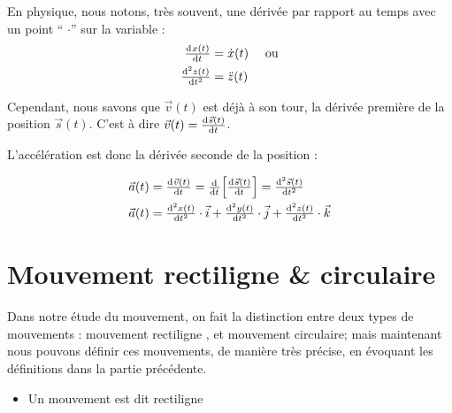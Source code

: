 \documentclass[11pt,a4paper]{article}
\begin{document}
\begingroup
\begin{table}
\begin{rmrq}
En physique, nous notons, très souvent, une dérivée par rapport au temps avec un point `` $\cdot$''  sur la variable  : 
\begin{align*}
    \od{x(t)}{t} &= \dot{x}(t) \quad \text{ ou} \\
    \od[2]{z(t)}{t} &= \Ddot{z}(t)
\end{align*}
\end{rmrq}
\end{table}  

Cependant, nous savons que $\vec{v}(t)$ est déjà à son tour, la dérivée première de la position $\vec{s}(t)$. C'est à dire $\vec{v}(t) = \od{\vec{s}(t)}{t}$. 

L'accélération est donc la dérivée seconde de la position : 

\begin{align*}
    \Vec{a}(t) &= \od{\Vec{v}(t)}{t} = \od{ }{t}\Big[ \od{\vec{s}(t)}{t} \Big] = \od[2]{\vec{s}(t)}{t}\\
    \Vec{a}(t) &= \od[2]{x(t)}{t}\cdot \Vec{i} + \od[2]{y(t)}{t}\cdot \Vec{j} + \od[2]{z(t)}{t}\cdot \Vec{k} \\
\end{align*}
\endgroup

\section{Mouvement rectiligne \& circulaire}

Dans notre étude du mouvement, on fait la distinction entre deux types de mouvements : mouvement rectiligne , et mouvement circulaire; mais maintenant nous pouvons définir ces mouvements, de manière très précise, en évoquant les définitions dans la partie précédente. 

\begin{itemize}
    \item Un mouvement est dit rectiligne 
\end{itemize}






\end{document}
